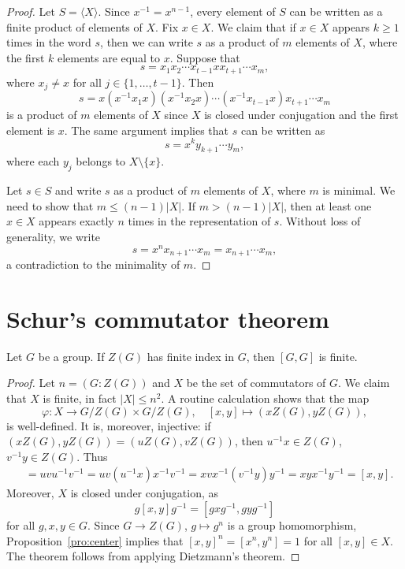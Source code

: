 \begin{proof}
	Let $S=\langle X\rangle$. Since $x^{-1}=x^{n-1}$, every element of $S$ can be 
	written as a finite product of elements of $X$. 
	Fix $x\in X$. We claim that if $x\in X$ appears $k\geq 1$ times 
	in the word $s$, then we can write $s$ as a product of $m$
	elements of $X$, where the first $k$ elements are equal to $x$. Suppose that 
	\[
	s=x_1x_2\cdots x_{t-1}xx_{t+1}\cdots x_m,
	\]
	where $x_j\ne x$ for all $j\in\{1,\dots,t-1\}$. Then 
	\[
		s=x(x^{-1}x_1x)(x^{-1}x_2x)\cdots (x^{-1}x_{t-1}x)x_{t+1}\cdots x_m
	\]
	is a product of $m$ elements of $X$ since $X$ is closed under conjugation and 
	the first element is $x$. The same argument implies that $s$
	can be written as 
	\[
		s=x^ky_{k+1}\cdots y_m,
	\]
	where each $y_j$ belongs to $X\setminus\{x\}$.

	Let $s\in S$ and write $s$ as a product of $m$ elements of 
	$X$, where $m$ is minimal. We need to show that 
	$m\leq (n-1)|X|$. 
	If $m>(n-1)|X|$, 
	then at least one $x\in X$ appears exactly $n$ 
	times in the representation of 
	$s$. Without loss of generality, we write 
	\[
		s=x^nx_{n+1}\cdots x_m=x_{n+1}\cdots x_m,
	\]
	a contradiction to the minimality of $m$. 
\end{proof}

\section{Schur's commutator theorem}

\begin{theorem}[Schur]
\label{thm:Schur}
	Let $G$ be a group. 
	If $Z(G)$ has finite index in $G$, then $[G,G]$ is finite.
\end{theorem}

\begin{proof}
	Let $n=(G:Z(G))$ and  
	$X$ be the set of commutators of $G$. We claim that $X$ is finite, in fact
	$|X|\leq n^2$.
	A routine calculation shows that the map 
	\[
		\varphi\colon X\to G/Z(G)\times G/Z(G),\quad [x,y]\mapsto (xZ(G),yZ(G)),
	\]
	is well-defined. It is, moreover, 
	injective: if $(xZ(G),yZ(G))=(uZ(G),vZ(G))$, then $u^{-1}x\in Z(G)$, 
	$v^{-1}y\in Z(G)$. Thus 
	\begin{align*}
		[u,v]&=uvu^{-1}v^{-1}=uv(u^{-1}x)x^{-1}v^{-1}=xvx^{-1}(v^{-1}y)y^{-1}=xyx^{-1}y^{-1}=[x,y].
	\end{align*}
	Moreover, $X$ is closed under conjugation, as 
	\[
		g[x,y]g^{-1}=[gxg^{-1},gyg^{-1}]
	\]
	for all $g,x,y\in G$. Since $G\to Z(G)$, $g\mapsto g^n$ is a group
	homomorphism, Proposition~\ref{pro:center} implies that $[x,y]^n=[x^n,y^n]=1$ for
	all $[x,y]\in X$.  The theorem follows from applying Dietzmann's theorem. 
\end{proof}

